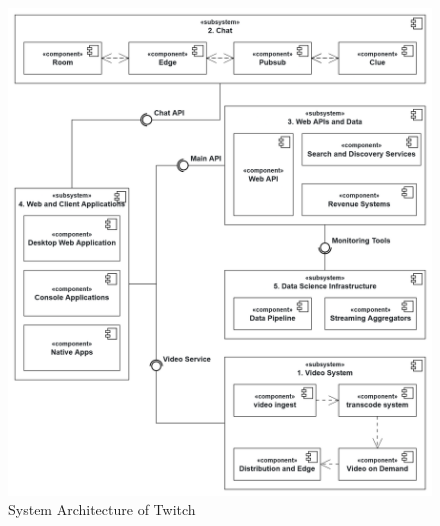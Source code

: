 \begin{figure}[htpb]
    \centering
    \includegraphics[width=\linewidth]{images/TwitchArchitectureNew.png}
    \caption[System Architecture of Twitch]{System Architecture of Twitch}\label{fig:twitch-architecture}
\end{figure}

